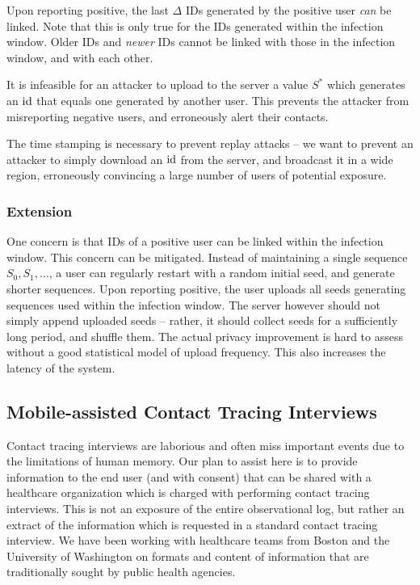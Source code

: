 \documentclass{article}
\begin{document}
 Upon reporting positive, the last $\Delta$ IDs generated by the positive user {\em can} be linked. Note that this is only true for the IDs generated within the infection window. Older IDs and {\em newer} IDs cannot be linked with those in the infection window, and with each other.
\smallskip

 It is infeasible for an attacker to upload to the server a value $S^*$ which generates an $\mathrm{id}$ that equals one generated by another user. This prevents the attacker from misreporting negative users, and erroneously alert their contacts.  
\smallskip

 The time stamping is necessary to prevent replay attacks -- we want to prevent an attacker to simply download an $\mathrm{id}$ from the server, and broadcast it in a wide region, erroneously convincing a large number of users of potential exposure.

\subsubsection{Extension}

One concern is that IDs of a positive user can be linked within the infection window. This concern can be mitigated. Instead of maintaining a single sequence $S_0, S_1, \ldots$, a user can regularly restart with a random initial seed, and generate  shorter sequences. Upon reporting positive, the user uploads all seeds generating sequences used within the infection window. The server however should not simply append uploaded seeds -- rather, it should collect seeds for a sufficiently long period, and shuffle them. The actual privacy improvement is  hard to assess without a good statistical model of upload frequency. This also increases the latency of the system.

\subsection{Mobile-assisted Contact Tracing Interviews} 
Contact tracing interviews are laborious and often miss important events due to the limitations of human memory.  Our plan to assist here is to provide information to the end user (and with consent) that can be shared with a healthcare organization which is charged with performing contact tracing interviews.   This is not an exposure of the entire observational log, but rather an extract of the information which is requested in a standard contact tracing interview. We have been working with healthcare teams from Boston and the University of Washington on formats and content of information that are traditionally sought by public health agencies.
\end{document}
